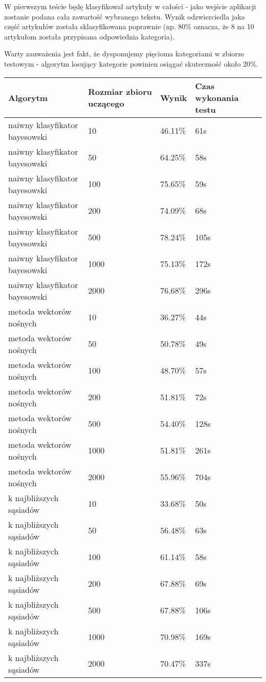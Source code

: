 W pierwszym teście będę klasyfikował artykuły w całości - jako wejście aplikacji zostanie podana cała zawartość wybranego tekstu. Wynik odzwierciedla jaka część artykułów została sklasyfikowana poprawnie (np. 80\% oznacza, że 8 na 10 artykułom została przypisana odpowiednia kategoria).

Warty zauważenia jest fakt, że dysponujemy pięcioma kategoriami w zbiorze testowym - algorytm losujący kategorie powinien osiągać skuteczność około 20\%.

\begin{center}
\begin{longtable}{ |l|l|l|l| } 
 \hline
 Algorytm & Rozmiar zbioru uczącego & Wynik & Czas wykonania testu \\ 
 \hline
 naiwny klasyfikator bayesowski & 10    & 46.11\% & 61s\\
 naiwny klasyfikator bayesowski & 50    & 64.25\% & 58s\\
 naiwny klasyfikator bayesowski & 100   & 75.65\% & 59s\\
 naiwny klasyfikator bayesowski & 200   & 74.09\% & 68s\\
 naiwny klasyfikator bayesowski & 500   & 78.24\% & 105s\\
 naiwny klasyfikator bayesowski & 1000  & 75.13\% & 172s\\
 naiwny klasyfikator bayesowski & 2000  & 76.68\% & 296s\\
\hline
 metoda wektorów nośnych & 10   & 36.27\% & 44s\\
 metoda wektorów nośnych & 50   & 50.78\% & 49s\\
 metoda wektorów nośnych & 100  & 48.70\% & 57s\\
 metoda wektorów nośnych & 200  & 51.81\% & 72s\\
 metoda wektorów nośnych & 500  & 54.40\% & 128s\\
 metoda wektorów nośnych & 1000 & 51.81\% & 261s\\
 metoda wektorów nośnych & 2000 & 55.96\% & 704s\\
\hline
 k najbliższych sąsiadów & 10   & 33.68\% & 50s\\
 k najbliższych sąsiadów & 50   & 56.48\% & 63s\\
 k najbliższych sąsiadów & 100  & 61.14\% & 58s\\
 k najbliższych sąsiadów & 200  & 67.88\% & 69s\\
 k najbliższych sąsiadów & 500  & 67.88\% & 106s\\
 k najbliższych sąsiadów & 1000 & 70.98\% & 169s\\
 k najbliższych sąsiadów & 2000 & 70.47\% & 337s\\
 \hline
\end{longtable}
\end{center}

